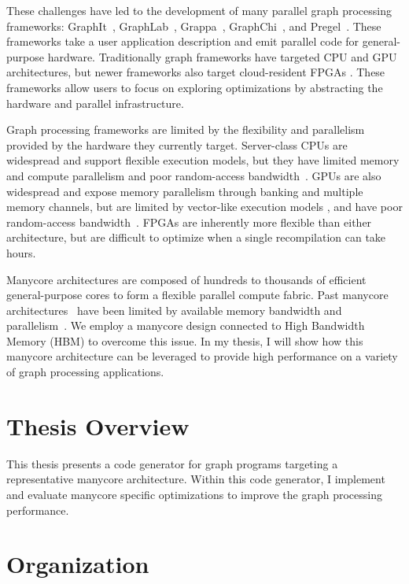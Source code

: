 These challenges have led to the development of many parallel graph processing frameworks: GraphIt~\cite{zhang2018graphit}, GraphLab~\cite{low2010graphlab, low2012distributed}, Grappa~\cite{nelson2015grappa}, GraphChi~\cite{aapo2012graphchi}, and Pregel~\cite{malewicz2010pregel}. 
These frameworks take a user application description and emit parallel code for general-purpose hardware.
Traditionally graph frameworks have targeted CPU and GPU architectures, but newer frameworks also target cloud-resident FPGAs \cite{engelhardt2016gravf, dai2016fpgp}.
These frameworks allow users to focus on exploring optimizations by abstracting the hardware and parallel infrastructure.

Graph processing frameworks are limited by the flexibility and parallelism provided by the hardware they currently target.
Server-class CPUs are widespread and support flexible execution models, but they have limited memory and compute parallelism and poor random-access bandwidth~\citep{beamer2015locality}.
GPUs are also widespread and expose memory parallelism through banking and multiple memory channels, but are limited by vector-like execution models \cite{xu2014graph, shi2018graph}, and have poor random-access bandwidth~\citep{aamodt2018general}.
FPGAs are inherently more flexible than either architecture, but are difficult to optimize when a single recompilation can take hours. 
  
Manycore architectures are composed of hundreds to thousands of efficient general-purpose cores to form a flexible parallel compute fabric.
Past manycore architectures~\cite{ramey2011tilera, agathos2015parallela, gwennap2011adapteva} have been limited by available memory bandwidth and parallelism~\citep{loi2010efficient}.  We employ a manycore design connected to High Bandwidth Memory (HBM) \cite{jedec2020hbm, jouppi2017datacenter} to overcome this issue.
In my thesis, I will show how this manycore architecture can be leveraged to provide high performance on a variety of graph processing applications.


\section{Thesis Overview}
This thesis presents a code generator for graph programs targeting a representative manycore architecture. 
Within this code generator, I implement and evaluate manycore specific optimizations to improve the graph processing performance. 
\section{Organization}

